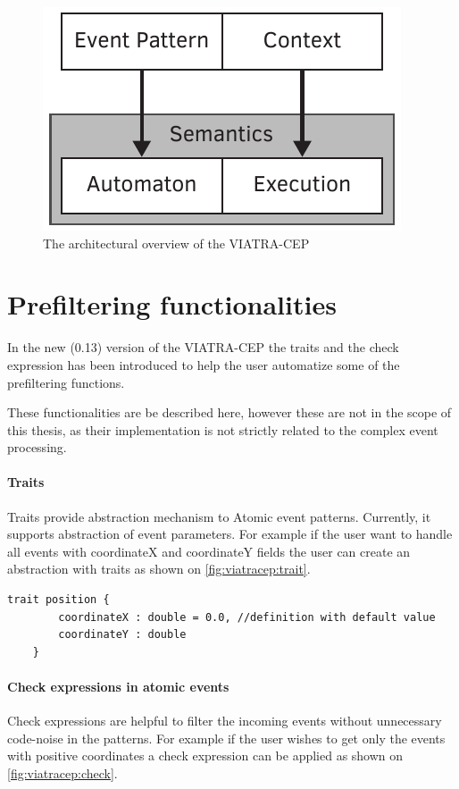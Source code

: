 \begin{figure}[h]
	\centering
	\includegraphics[width=0.4\linewidth]{figures/chapter_3/oldcep}
	\caption{The architectural overview of the VIATRA-CEP}
	\label{fig:viatracep:oldcep}
\end{figure}

\section{Prefiltering functionalities}
In the new (0.13) version of the VIATRA-CEP the traits and the check expression has been introduced to help the user automatize some of the prefiltering functions.

These functionalities are be described here, however these are not in the scope of this thesis, as their implementation is not strictly related to the complex event processing.

\paragraph{Traits}
Traits provide abstraction mechanism to Atomic event patterns. Currently, it supports abstraction of event parameters. For example if the user want to handle all events with coordinateX and coordinateY fields the user can create an abstraction with traits as shown on \cref{fig:viatracep:trait}.


\begin{lstlisting}[caption={Example of the traits in VIATRA-CEP},label={fig:viatracep:trait}]
	trait position {
		coordinateX : double = 0.0, //definition with default value
		coordinateY : double
	}
\end{lstlisting}


\paragraph{Check expressions in atomic events}

Check expressions are helpful to filter the incoming events without unnecessary code-noise in the patterns. For example if the user wishes to get only the events with positive coordinates a check expression can be applied as shown on \cref{fig:viatracep:check}.

